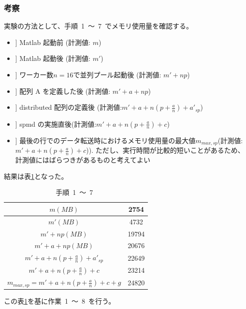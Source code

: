 \documentclass[10pt]{jarticle}
\begin{document}
\subsubsection{考察}
%
実験の方法として、手順\ 1\ ～\ 7\ でメモリ使用量を確認する。
\begin{itemize}[left=30pt]
	\item[[手順1]] Matlab 起動前 (計測値: $m$)
	\item[[手順2]] Matlab 起動後 (計測値: $m'$)
	\item[[手順3]] ワーカー数$n=16$で並列プール起動後 (計測値: $m' + np$)
	\item[[手順4]] 配列 A を定義した後 (計測値: $m' + a + np$)
	\item[[手順5]] distributed 配列の定義後 (計測値:$m' + a + n(p + \frac{a}{n}) + a'_{sp}$)
	\item[[手順6]] spmd の実施直後(計測値:$m' + a + n(p + \frac{a}{n}) + c$)
	\item[[手順7]] 最後の行でのデータ転送時におけるメモリ使用量の最大値$ m_{max,sp} $(計測値:$m' + a + n(p + \frac{a}{n}) + c$)). 
	ただし、実行時間が比較的短いことがあるため、計測値にはばらつきがあるものと考えてよい
\end{itemize}
結果は表\ref{table:21t}となった。
\begin{table}[htbp]
	\centering
	\caption{手順\ 1\ ～\ 7\ }
	\label{table:21t}
	\begin{tabular}{|c|c|}
		\hline
		$m(MB)$ & 2754 \\
		\hline
		$m'(MB)$ & 4732 \\
		\hline
		$m' + np(MB)$ & 19794 \\
		\hline
		$m' + a + np(MB)$ & 20676 \\
		\hline
		$m' + a + n(p + \frac{a}{n}) + a'_{sp}$ & 22649 \\
		\hline
		$m' + a + n(p + \frac{a}{n}) + c$ & 23214 \\
		\hline
		$m_{max,sp} = m' + a + n(p + \frac{a}{n}) + c + g$ & 24820 \\
		\hline
	\end{tabular}
\end{table}
この表\ref{table:21t}を基に作業\ 1\ ～\ 8\ を行う。
\end{document}
